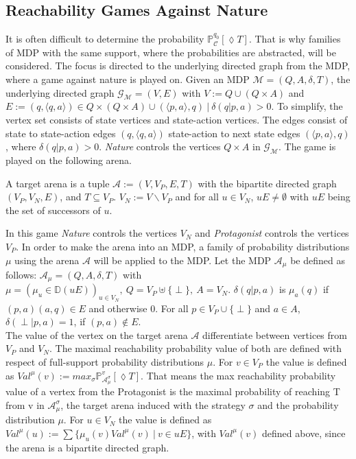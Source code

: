 \subsection{Reachability Games Against Nature}
It is often difficult to determine the probability $\mathbb{P}^{q_0}_\mathcal{C}[\lozenge T]$. 
That is why families of MDP with the same support, where the probabilities are abstracted, will be considered. 
The focus is directed to the underlying directed graph from the MDP, where a game against nature is played on.
Given an MDP $\mathcal{M}=(Q,A,\delta,T)$, the underlying directed graph $\mathcal{G}_\mathcal{M}=(V,E)$ with 
$V:= Q\cup (Q\times A)$ and $E:={(q,\langle q,a\rangle)\in Q\times (Q\times A)}\cup{(\langle p,a\rangle,q)~|~\delta(q|p,a)>0}$.
To simplify, the vertex set consists of state vertices and state-action vertices. 
The edges consist of state to state-action edges $(q,\langle q,a\rangle)$ 
state-action to next state edges $(\langle p,a\rangle,q)$, where $\delta(q|p,a)>0$. 
\textit{Nature} controls the vertices $Q\times A$ in $\mathcal{G}_\mathcal{M}$. The game is played on the following arena. 

\begin{definition}
\label{def:target arena}
A target arena is a tuple $\mathcal{A}:= (V,V_P,E,T)$ with the bipartite directed graph $(V_P,V_N,E)$, and $T\subseteq V_P$. 
$V_N:= V\backslash V_P$ and for all $u\in V_N$, $uE \neq \emptyset$ with $uE$ being the set of successors of $u$. 
    
\end{definition}

\noindent
In this game \textit{Nature} controls the vertices $V_N$ and \textit{Protagonist} controls the vertices $V_P$. 
In order to make the arena into an MDP, a family of probability distributions $\mu$ using the arena $\mathcal{A}$ will be applied to the MDP.
Let the MDP $\mathcal{A}_\mu$ be defined as follows: $\mathcal{A}_\mu = (Q, A, \delta, T)$ with $\mu =(\mu_u \in \mathbb{D}(uE))_{u\in V_N},~ 
Q=V_P \uplus\{\perp\},~ A=V_N$. $\delta(q|p,a)$ is $\mu_a(q)$ if $(p,a)(a,q)\in E$ and otherwise 0. 
For all $p\in V_P\cup \{\perp\}$ and $a\in A$, $\delta(\perp|p,a)= 1$, if $(p,a) \not\in E$.
\newline
\\
The value of the vertex on the target arena $\mathcal{A}$ differentiate between vertices from $V_P$ and $ V_N$. 
The maximal reachability probability value of both are defined with respect of full-support probability distributions $\mu$. 
For $v\in V_P$ the value is defined as $Val^\mu(v):= max_\sigma \mathbb{P}^v_{\mathcal{A}^\sigma_\mu}[\lozenge T]$. 
That means the max reachability probability value of a vertex from the Protagonist is 
the maximal probability of reaching T from v in $\mathcal{A}^\sigma_\mu$, 
the target arena induced with the strategy $\sigma$ and the probability distribution $\mu$. 
For $u\in V_N$ the value is defined as $Val^\mu(u):=\sum\{\mu_u(v)Val^\mu(v)~|~v\in uE\}$, with $Val^\mu(v)$ defined above, 
since the arena is a bipartite directed graph.


